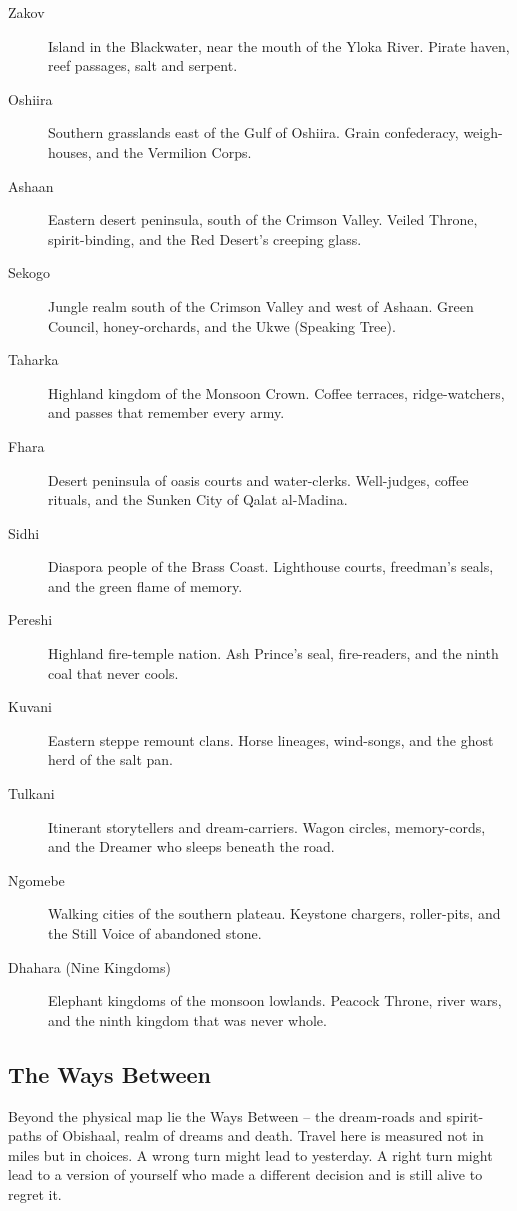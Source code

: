 \begin{description}
  \item[Zakov]  Island in the Blackwater, near the mouth of the Yloka River. Pirate haven, reef passages, salt and serpent.
  \item[Oshiira]  Southern grasslands east of the Gulf of Oshiira. Grain confederacy, weigh-houses, and the Vermilion Corps.
  \item[Ashaan]  Eastern desert peninsula, south of the Crimson Valley. Veiled Throne, spirit-binding, and the Red Desert's creeping glass.
  \item[Sekogo]  Jungle realm south of the Crimson Valley and west of Ashaan. Green Council, honey-orchards, and the Ukwe (Speaking Tree).
  \item[Taharka]  Highland kingdom of the Monsoon Crown. Coffee terraces, ridge-watchers, and passes that remember every army.
  \item[Fhara]  Desert peninsula of oasis courts and water-clerks. Well-judges, coffee rituals, and the Sunken City of Qalat al-Madina.
  \item[Sidhi]  Diaspora people of the Brass Coast. Lighthouse courts, freedman's seals, and the green flame of memory.
  \item[Pereshi]  Highland fire-temple nation. Ash Prince's seal, fire-readers, and the ninth coal that never cools.
  \item[Kuvani]  Eastern steppe remount clans. Horse lineages, wind-songs, and the ghost herd of the salt pan.
  \item[Tulkani]  Itinerant storytellers and dream-carriers. Wagon circles, memory-cords, and the Dreamer who sleeps beneath the road.
  \item[Ngomebe]  Walking cities of the southern plateau. Keystone chargers, roller-pits, and the Still Voice of abandoned stone.
  \item[Dhahara (Nine Kingdoms)]  Elephant kingdoms of the monsoon lowlands. Peacock Throne, river wars, and the ninth kingdom that was never whole.
\end{description}

\subsection*{The Ways Between}
\label{sec:ways-between}

Beyond the physical map lie the Ways Between -- the dream-roads and spirit-paths of Obishaal, realm of dreams and death. Travel here is measured not in miles but in choices. A wrong turn might lead to yesterday. A right turn might lead to a version of yourself who made a different decision and is still alive to regret it.

